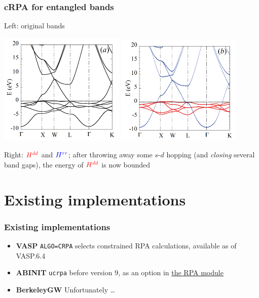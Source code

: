 \documentclass{beamer}
\newcommand{\xmark}{\ding{55}}%
\newcommand{\shortcode}[1]{\texttt{#1}}
\begin{document}
\begin{frame}
\frametitle{cRPA for entangled bands}

Left: original bands

\begin{center}
    \includegraphics[width=0.45\textwidth]{plots/ni-bands-1.PNG}
    \includegraphics[width=0.45\textwidth]{plots/ni-bands-no-entanble-1.PNG}
\end{center}

Right: $\textcolor{red}{H^{dd}}$ and $\textcolor{blue}{H^{rr}}$;
after throwing away some $s$-$d$ hopping 
(and \emph{closing} several band gaps), 
the energy of $\textcolor{red}{H^{dd}}$ is now bounded

\end{frame}

\section{Existing implementations}

\begin{frame}
\frametitle{Existing implementations}

\begin{itemize}
    \item \textbf{VASP}    
    \shortcode{ALGO=CRPA} selects constrained RPA calculations, 
    available as of VASP.6.4
    \item \textbf{ABINIT} 
    \shortcode{ucrpa} before version 9, 
    as an option in \href{https://docs.abinit.org/variables/gw/\#ucrpa}{the RPA module}
    \item \textbf{BerkeleyGW} \xmark Unfortunately \dots
\end{itemize}

\end{frame}
\end{document}
